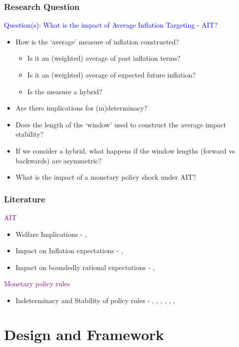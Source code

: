 \documentclass{beamer}
\begin{document}
\begin{frame}
	\frametitle{Research Question}
	\textcolor{blue}{Question(s): What is the impact of Average Inflation Targeting - AIT?}
	\begin{itemize}
		\item How is the `average' measure of inflation constructed?
		\begin{itemize}
			\item Is it an (weighted) average of past inflation terms?
			\item Is it an (weighted) average of expected future inflation?
			\item Is the measure a hybrid?
		\end{itemize}
		\item \setlength\itemsep{1em} Are there implications for (in)determinacy? 
		\item Does the length of the `window' used to construct the average impact stability?
		\item If we consider a hybrid, what happens if the window lengths (forward vs backwards) are asymmetric? 
		\item What is the impact of a monetary policy shock under AIT?
	\end{itemize}
\end{frame}

\begin{frame}
	\frametitle{Literature}
	\textcolor{purple}{AIT}
	\begin{itemize}
		\item Welfare Implications - \cite{budianto2020}, \cite{eo2020}
		\item Impact on Inflation expectations - \cite{coibion2020}, \cite{hoffmann2022}
		\item Impact on boundedly rational expectations - \cite{honka2021}, \cite{budianto2020}
	\end{itemize}
	\textcolor{purple}{Monetary policy rules}
	\begin{itemize}
		\item Indeterminacy and Stability of policy rules - \cite{clarida2000monetary}, \cite{lubik2004testing}, \cite{evans2005monetary}, \cite{nessen2005}, \cite{castelnuovo2015monetary}, \cite{mertens2019tying}, \cite{svensson2020monetary}
	\end{itemize}
\end{frame}

\section*{Design and Framework}
\end{document}
